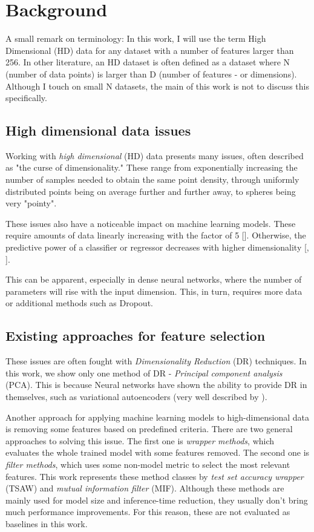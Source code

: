 \chapter{Background}
A small remark on terminology: In this work, I will use the term High Dimensional (HD) data for any dataset with a number of features larger than 256. In other literature, an HD dataset is often defined as a dataset where N (number of data points) is larger than D (number of features - or dimensions). Although I touch on small N datasets, the main of this work is not to discuss this specifically. 

\section{High dimensional data issues}
Working with \textit{high dimensional} (HD) data presents many issues, often described as "the curse of dimensionality." These range from exponentially increasing the number of samples needed to obtain the same point density, through uniformly distributed points being on average further and further away, to spheres being very "pointy".

These issues also have a noticeable impact on machine learning models. These require amounts of data linearly increasing with the factor of 5 [\cite{Koutroumbas}]. Otherwise, the predictive power of a classifier or regressor decreases with higher dimensionality [\cite{McLachlan}, \cite{Trunk}].

This can be apparent, especially in dense neural networks, where the number of parameters will rise with the input dimension. This, in turn, requires more data or additional methods such as Dropout.

\section{Existing approaches for feature selection}
These issues are often fought with \textit{Dimensionality Reduction} (DR) techniques. In this work, we show only one method of DR - \textit{Principal component analysis} (PCA). This is because Neural networks have shown the ability to provide DR in themselves, such as variational autoencoders (very well described by \cite{vae}).

Another approach for applying machine learning models to high-dimensional data is removing some features based on predefined criteria. There are two general approaches to solving this issue. The first one is \textit{wrapper methods}, which evaluates the whole trained model with some features removed. The second one is \textit{filter methods}, which uses some non-model metric to select the most relevant features. This work represents these method classes by \textit{test set accuracy wrapper} (TSAW) and \textit{mutual information filter} (MIF). Although these methods are mainly used for model size and inference-time reduction, they usually don't bring much performance improvements. For this reason, these are not evaluated as baselines in this work.

